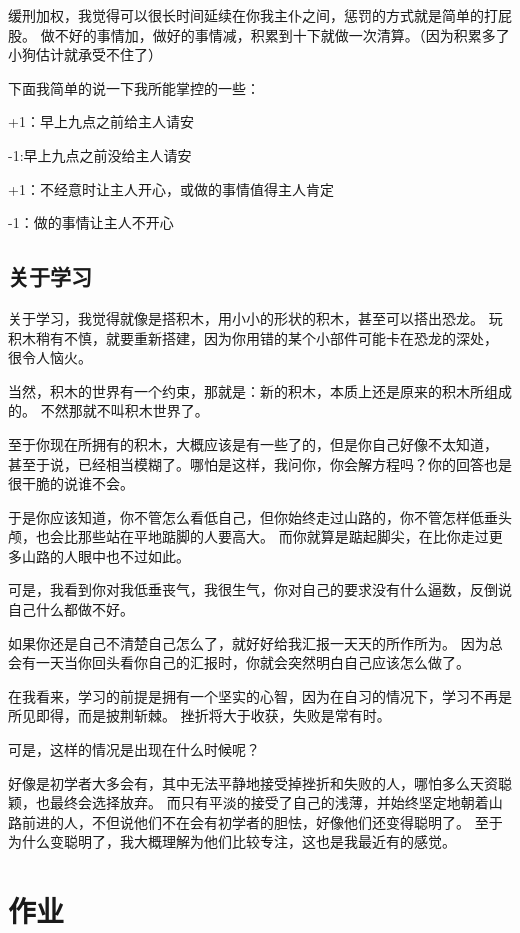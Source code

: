\documentclass[cn,12pt]{elegantbook}
\begin{document}
缓刑加权，我觉得可以很长时间延续在你我主仆之间，惩罚的方式就是简单的打屁股。
做不好的事情加，做好的事情减，积累到十下就做一次清算。（因为积累多了小狗估计就承受不住了）

下面我简单的说一下我所能掌控的一些：

+1：早上九点之前给主人请安

-1:早上九点之前没给主人请安

+1：不经意时让主人开心，或做的事情值得主人肯定

-1：做的事情让主人不开心

\newpage
\section{关于学习}
关于学习，我觉得就像是搭积木，用小小的形状的积木，甚至可以搭出恐龙。
玩积木稍有不慎，就要重新搭建，因为你用错的某个小部件可能卡在恐龙的深处，
很令人恼火。

当然，积木的世界有一个约束，那就是：新的积木，本质上还是原来的积木所组成的。
不然那就不叫积木世界了。

至于你现在所拥有的积木，大概应该是有一些了的，但是你自己好像不太知道，
甚至于说，已经相当模糊了。哪怕是这样，我问你，你会解方程吗？你的回答也是很干脆的说谁不会。

于是你应该知道，你不管怎么看低自己，但你始终走过山路的，你不管怎样低垂头颅，也会比那些站在平地踮脚的人要高大。
而你就算是踮起脚尖，在比你走过更多山路的人眼中也不过如此。

可是，我看到你对我低垂丧气，我很生气，你对自己的要求没有什么逼数，反倒说自己什么都做不好。

如果你还是自己不清楚自己怎么了，就好好给我汇报一天天的所作所为。
因为总会有一天当你回头看你自己的汇报时，你就会突然明白自己应该怎么做了。

\vspace{4em}
在我看来，学习的前提是拥有一个坚实的心智，因为在自习的情况下，学习不再是所见即得，而是披荆斩棘。
挫折将大于收获，失败是常有时。

可是，这样的情况是出现在什么时候呢？

好像是初学者大多会有，其中无法平静地接受掉挫折和失败的人，哪怕多么天资聪颖，也最终会选择放弃。
而只有平淡的接受了自己的浅薄，并始终坚定地朝着山路前进的人，不但说他们不在会有初学者的胆怯，好像他们还变得聪明了。
至于为什么变聪明了，我大概理解为他们比较专注，这也是我最近有的感觉。




\appendix



\chapter{作业}
\end{document}
